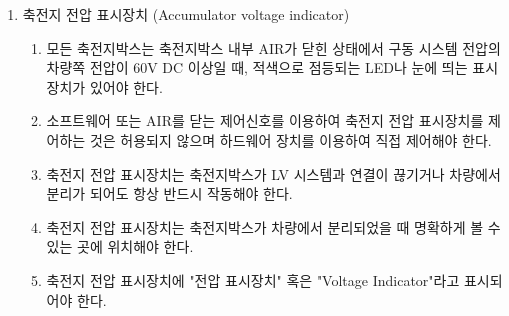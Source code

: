 \documentclass[final,a4paper,10pt]{report}
\begin{document}
\begin{enumerate}
  \item\label{rule:formula-technical.accumulator-container-electrical.voltage-indicator} 축전지 전압 표시장치 (Accumulator voltage indicator)
    \begin{enumerate}
      \item\label{rule:formula-technical.accumulator-container-electrical.voltage-indicator.activation-above-60vdc} 모든 축전지박스는 축전지박스 내부 AIR가 닫힌 상태에서 구동 시스템 전압의 차량쪽 전압이 60V DC 이상일 때, 적색으로 점등되는 LED나 눈에 띄는 표시장치가 있어야 한다.
      \item\label{rule:formula-technical.accumulator-container-electrical.voltage-indicator.hardware-only-control} 소프트웨어 또는 AIR를 닫는 제어신호를 이용하여 축전지 전압 표시장치를 제어하는 것은 허용되지 않으며 하드웨어 장치를 이용하여 직접 제어해야 한다.
      \item\label{rule:formula-technical.accumulator-container-electrical.voltage-indicator.works-when-disconnected} 축전지 전압 표시장치는 축전지박스가 LV 시스템과 연결이 끊기거나 차량에서 분리가 되어도 항상 반드시 작동해야 한다.
      \item\label{rule:formula-technical.accumulator-container-electrical.voltage-indicator.visible-when-removed} 축전지 전압 표시장치는 축전지박스가 차량에서 분리되었을 때 명확하게 볼 수 있는 곳에 위치해야 한다.
      \item\label{rule:formula-technical.accumulator-container-electrical.voltage-indicator.indicator-label} 축전지 전압 표시장치에 "전압 표시장치" 혹은 "Voltage Indicator"라고 표시되어야 한다.
    \end{enumerate}
\end{enumerate}
\end{document}
